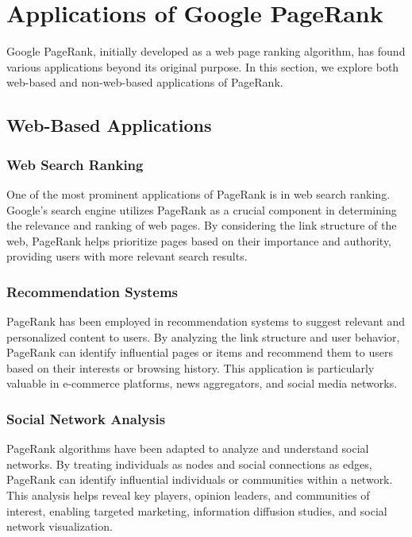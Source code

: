 \documentclass{article}
\begin{document}
\section{Applications of Google PageRank}

Google PageRank, initially developed as a web page ranking algorithm, has found various applications beyond its original purpose. In this section, we explore both web-based and non-web-based applications of PageRank.

\subsection{Web-Based Applications}

\subsubsection{Web Search Ranking}

One of the most prominent applications of PageRank is in web search ranking. Google's search engine utilizes PageRank as a crucial component in determining the relevance and ranking of web pages. By considering the link structure of the web, PageRank helps prioritize pages based on their importance and authority, providing users with more relevant search results.

\subsubsection{Recommendation Systems}

PageRank has been employed in recommendation systems to suggest relevant and personalized content to users. By analyzing the link structure and user behavior, PageRank can identify influential pages or items and recommend them to users based on their interests or browsing history. This application is particularly valuable in e-commerce platforms, news aggregators, and social media networks.

\subsubsection{Social Network Analysis}

PageRank algorithms have been adapted to analyze and understand social networks. By treating individuals as nodes and social connections as edges, PageRank can identify influential individuals or communities within a network. This analysis helps reveal key players, opinion leaders, and communities of interest, enabling targeted marketing, information diffusion studies, and social network visualization.
\end{document}

